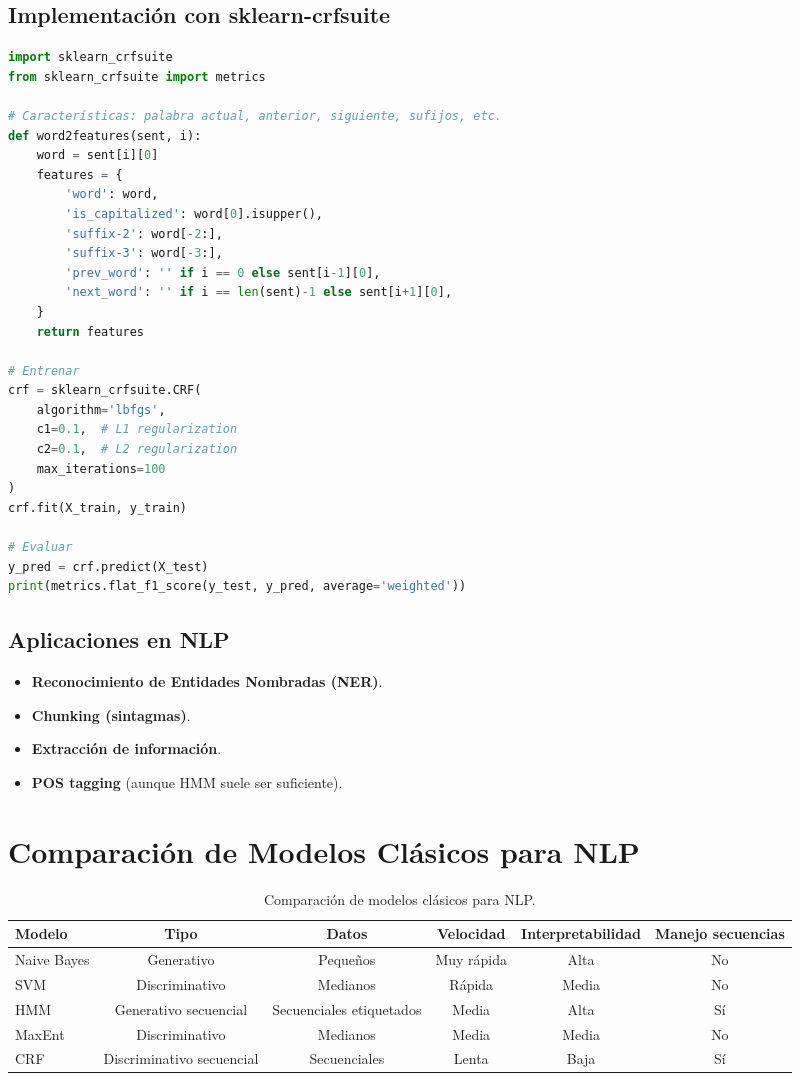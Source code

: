 \documentclass[12pt,a4paper,openany,oneside]{book}
\begin{document}
\subsection{Implementación con sklearn-crfsuite}
\begin{lstlisting}[language=Python]
import sklearn_crfsuite
from sklearn_crfsuite import metrics

# Características: palabra actual, anterior, siguiente, sufijos, etc.
def word2features(sent, i):
    word = sent[i][0]
    features = {
        'word': word,
        'is_capitalized': word[0].isupper(),
        'suffix-2': word[-2:],
        'suffix-3': word[-3:],
        'prev_word': '' if i == 0 else sent[i-1][0],
        'next_word': '' if i == len(sent)-1 else sent[i+1][0],
    }
    return features

# Entrenar
crf = sklearn_crfsuite.CRF(
    algorithm='lbfgs',
    c1=0.1,  # L1 regularization
    c2=0.1,  # L2 regularization
    max_iterations=100
)
crf.fit(X_train, y_train)

# Evaluar
y_pred = crf.predict(X_test)
print(metrics.flat_f1_score(y_test, y_pred, average='weighted'))
\end{lstlisting}

\subsection{Aplicaciones en NLP}
\begin{itemize}
    \item \textbf{Reconocimiento de Entidades Nombradas (NER)}.
    \item \textbf{Chunking (sintagmas)}.
    \item \textbf{Extracción de información}.
    \item \textbf{POS tagging} (aunque HMM suele ser suficiente).
\end{itemize}

\section{Comparación de Modelos Clásicos para NLP}

\begin{table}[h]
\centering
\begin{tabular}{|l|c|c|c|c|c|}
\hline
\textbf{Modelo} & \textbf{Tipo} & \textbf{Datos} & \textbf{Velocidad} & \textbf{Interpretabilidad} & \textbf{Manejo secuencias} \\
\hline
Naive Bayes & Generativo & Pequeños & Muy rápida & Alta & No \\
SVM & Discriminativo & Medianos & Rápida & Media & No \\
HMM & Generativo secuencial & Secuenciales etiquetados & Media & Alta & Sí \\
MaxEnt & Discriminativo & Medianos & Media & Media & No \\
CRF & Discriminativo secuencial & Secuenciales & Lenta & Baja & Sí \\
\hline
\end{tabular}
\caption{Comparación de modelos clásicos para NLP.}
\end{table}
\end{document}
